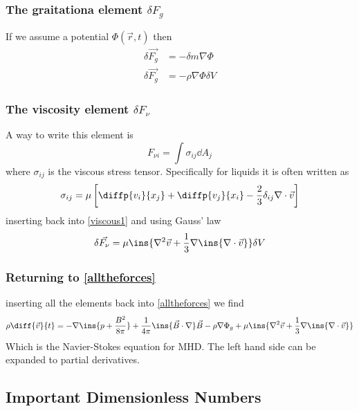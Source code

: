 \subsubsection{The graitationa element \(\delta F_g\)}
If we assume a potential \(\Phi(\vec{r},t)\) then
\begin{align}
    \delta\vec{F_g} &= -\delta m \nabla\Phi \\
    \delta \vec{F_g} &= -\rho\nabla\Phi\delta V
\end{align}
\subsubsection{The viscosity element \(\delta F_\nu \)}
A way to write this element is
\begin{equation}\label{viscous1}
    F_{\nu i} = \int \sigma_{ij}\dd A_j
\end{equation}
where \(\sigma_{ij}\) is the viscous stress tensor. Specifically for liquids it is often written as
\begin{equation}
    \sigma_{ij} = \mu\left[\diffp{v_i}{x_j}+\diffp{v_j}{x_i}-\frac{2}{3}\delta_{ij}\nabla\cdot\vec{v}\right]
\end{equation}
inserting back into \ref{viscous1} and using Gauss' law
\begin{equation}
    \delta\vec{F_\nu} = \mu\ins{\nabla^2\vec{v} + \frac{1}{3}\nabla\ins{\nabla\cdot\vec{v}}}\delta V
\end{equation}
\subsubsection{Returning to \ref{alltheforces}}
inserting all the elements back into \ref{alltheforces} we find
\begin{equation}
    \rho\diff{\vec{v}}{t} = -\nabla\ins{p+\frac{B^2}{8\pi}}+\frac{1}{4\pi}\ins{\vec{B}\cdot\nabla}\vec{B}-\rho\nabla\Phi_g + \mu\ins{\nabla^2\vec{v}+\frac{1}{3}\nabla\ins{\nabla\cdot\vec{v}}}
\end{equation}
Which is the Navier-Stokes equation for MHD. The left hand side can be expanded to partial derivatives.
\subsection{Important Dimensionless Numbers}
